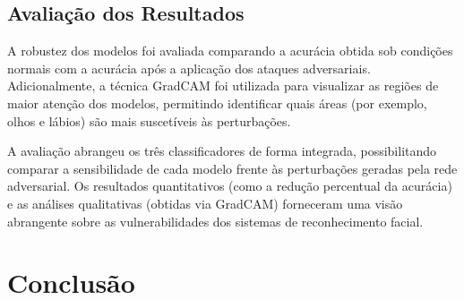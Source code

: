 \documentclass[12pt]{article}
\begin{document}
\subsection{Avaliação dos Resultados}

A robustez dos modelos foi avaliada comparando a acurácia obtida sob condições
normais com a acurácia após a aplicação dos ataques adversariais.
Adicionalmente, a técnica GradCAM foi utilizada para visualizar as regiões de
maior atenção dos modelos, permitindo identificar quais áreas (por exemplo,
olhos e lábios) são mais suscetíveis às perturbações.

A avaliação abrangeu os três classificadores de forma integrada, possibilitando
comparar a sensibilidade de cada modelo frente às perturbações geradas pela
rede adversarial. Os resultados quantitativos (como a redução percentual da
acurácia) e as análises qualitativas (obtidas via GradCAM) forneceram uma visão
abrangente sobre as vulnerabilidades dos sistemas de reconhecimento facial.

\section{Conclusão}



\nocite{*}
\end{document}
